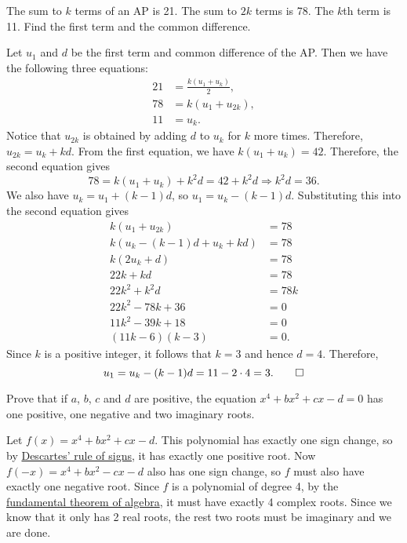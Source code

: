 \begin{question}
    The sum to $k$ terms of an AP is 21. The sum to $2k$ terms is 78. The $k$th
    term is 11. Find the first term and the common difference. 
\end{question}
\begin{solution}
    Let $u_1$ and $d$ be the first term and common difference of the AP. 
    Then we have the following three equations:
    \begin{align*}
        21 &= \frac{k(u_1 + u_k)}{2},\\
        78 &= k(u_1 + u_{2k}),\\
        11 &= u_k.
    \end{align*}
    Notice that $u_{2k}$ is obtained by adding $d$ to $u_k$ for $k$ more times.
    Therefore, $u_{2k} = u_k + kd$. From the first equation, we have $k(u_1 +
    u_k) = 42$. Therefore, the second equation gives
    \[ 78 = k(u_1 + u_k) + k^2d = 42 + k^2d \Longrightarrow k^2d = 36. \]
    We also have $u_k = u_1 + (k - 1)d$, so $u_1 = u_k - (k - 1)d$.
    Substituting this into the second equation gives
    \begin{align*}
        k(u_1 + u_{2k}) &= 78\\
        k(u_k - (k - 1)d + u_k + kd) &= 78\\
        k(2u_k + d) &= 78\\
        22k + kd &= 78\\
        22k^2 + k^2d &= 78k\\
        22k^2 - 78k + 36 &= 0\\
        11k^2 - 39k + 18 &= 0\\
        (11k - 6)(k - 3) &= 0.
    \end{align*}
    Since $k$ is a positive integer, it follows that $k = 3$ and hence $d = 4$.
    Therefore,
    \[ u_1 = u_k - (k - 1)d = 11 - 2\cdot 4 = 3. \qedhere \]
\end{solution}

\begin{question}
    Prove that if $a$, $b$, $c$ and $d$ are positive, the equation $x^4 + bx^2
    + cx - d = 0$ has one positive, one negative and two imaginary roots.
\end{question}
\begin{solution}
    Let $f(x) = x^4 + bx^2 + cx - d$. This polynomial has exactly one sign
    change, so by \hyperref[thm: ruleofsigns]{Descartes' rule of signs}, it has
    exactly one positive root. Now $f(-x) = x^4 + bx^2 - cx - d$ also has one
    sign change, so $f$ must also have exactly one negative root. Since $f$ is
    a polynomial of degree 4, by the \hyperref[thm:
    fundamentalthmofalg]{fundamental theorem of algebra}, it must have exactly
    4 complex roots. Since we know that it only has 2 real roots, the rest two
    roots must be imaginary and we are done.
\end{solution}

